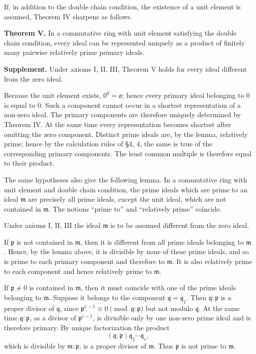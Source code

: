 \documentclass[11pt]{article}
\begin{document}
If, in addition to the double chain condition, the existence of a unit
element is assumed, Theorem IV sharpens as follows.

\textbf{Theorem V.} In a commutative ring with unit element satisfying
the double chain condition, every ideal can be represented uniquely as a
product of finitely many pairwise relatively prime primary ideals.

\textbf{Supplement.} Under axioms I, II, III, Theorem V holds for every
ideal different from the zero ideal.

Because the unit element exists, \(0^0=\mathfrak o\); hence every
primary ideal belonging to \(0\) is equal to \(0\). Such a component
cannot occur in a shortest representation of a non-zero ideal. The
primary components are therefore uniquely determined by Theorem IV. At
the same time every representation becomes shortest after omitting the
zero component. Distinct prime ideals are, by the lemma, relatively
prime; hence by the calculation rules of §4, 4, the same is true of the
corresponding primary components. The least common multiple is therefore
equal to their product.

The same hypotheses also give the following lemma. In a commutative ring
with unit element and double chain condition, the prime ideals which are
prime to an ideal \(\mathfrak m\) are precisely all prime ideals, except
the unit ideal, which are not contained in \(\mathfrak m\). The notions
``prime to'' and ``relatively prime'' coincide.

Under axioms I, II, III the ideal \(\mathfrak m\) is to be assumed
different from the zero ideal.

If \(\mathfrak p\) is not contained in \(\mathfrak m\), then it is
different from all prime ideals belonging to \(\mathfrak m\). Hence, by
the lemma above, it is divisible by none of these prime ideals, and so
is prime to each primary component and therefore to \(\mathfrak m\). It
is also relatively prime to each component and hence relatively prime to
\(\mathfrak m\).

If \(\mathfrak p\ne0\) is contained in \(\mathfrak m\), then it must
coincide with one of the prime ideals belonging to \(\mathfrak m\).
Suppose it belongs to the component \(\mathfrak q=\mathfrak q_1\). Then
\(\mathfrak q:\mathfrak p\) is a proper divisor of \(\mathfrak q\),
since \(\mathfrak p^{e-1}\equiv0\pmod{\mathfrak q:\mathfrak p}\) but not
modulo \(\mathfrak q\). At the same time \(\mathfrak q:\mathfrak p\), as
a divisor of \(\mathfrak p^{e-1}\), is divisible only by one non-zero
prime ideal and is therefore primary. By unique factorization the
product \[
  (\mathfrak q:\mathfrak p)\mathfrak q_2\cdots\mathfrak q_r,
\] which is divisible by \(\mathfrak m:\mathfrak p\), is a proper
divisor of \(\mathfrak m\). Thus \(\mathfrak p\) is not prime to
\(\mathfrak m\).
\end{document}
